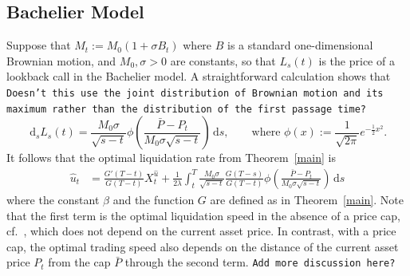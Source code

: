 \documentclass[11pt]{article}
\theoremstyle{definition}
\theoremstyle{remark}
\newcommand{\ts}{\textstyle}
\newcommand{\de}{\,\mathrm{d}}
\begin{document}
\subsection{Bachelier Model}
Suppose that $M_t:=M_0(1+ \sigma B_t)$ where $B$ is a standard one-dimensional Brownian motion, and $M_0, \sigma>0$ are constants, so that $L_s(t)$ is the price of a lookback call in the Bachelier model. A straightforward calculation shows that \texttt{Doesn't this use the joint distribution of Brownian motion and its maximum rather than the distribution of the first passage time?}
\[
\de_s L_s(t) = \frac{M_0\sigma}{\sqrt{s-t}}\phi\left(\frac{\bar{P}-P_t}{M_0\sigma\sqrt{s-t}}\right)\de s,\qquad\text{where } \phi(x):=\frac{1}{\sqrt{2\pi}}e^{-\frac{1}{2}x^2}.
\]
It follows that the optimal liquidation rate from Theorem~\ref{main} is
\begin{align*}
\hat{u}_t & = \frac{G'(T-t)}{G(T-t)} X^{\hat{u}}_t +\frac{1}{2\lambda} \int_t^T \frac{M_0\sigma}{\sqrt{s-t}} \frac{G(T-s)}{G(T-t)} \phi\left(\frac{\bar{P}-P_t}{M_0\sigma\sqrt{s-t}}\right) \de s
\end{align*}
where the constant $\beta$ and the function $G$ are defined as in Theorem~\ref{main}. Note that the first term is the optimal liquidation speed in the absence of a price cap, cf.~\cite{almgren.chriss.01}, which does not depend on the current asset price. In contrast, with a price cap, the optimal trading speed also depends on the distance of the current asset price $P_t$ from the cap $\bar{P}$ through the second term. \texttt{Add more discussion here?}

\end{document}
